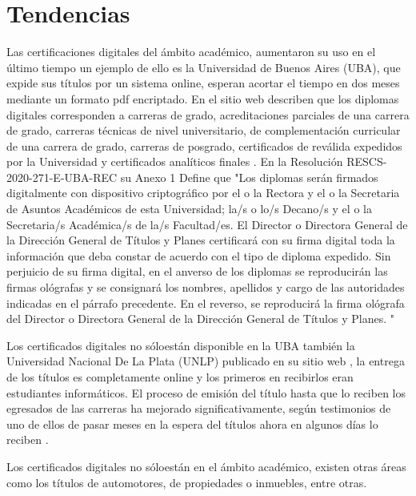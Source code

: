 \section{Tendencias}
Las certificaciones digitales del ámbito académico, aumentaron su uso en el último tiempo un ejemplo de ello es  
la Universidad de Buenos Aires (UBA), que expide sus títulos por un sistema online, esperan acortar el tiempo 
en dos meses mediante un formato pdf encriptado. En el sitio web describen que los diplomas digitales 
corresponden a carreras  de grado, acreditaciones parciales de una carrera de grado, carreras técnicas de nivel universitario, de 
complementación curricular de una carrera de grado, carreras de posgrado, certificados de reválida expedidos 
por la Universidad y certificados analíticos finales \cite[]{facultad_de_farmacia_y_bioquimica_universidad_de_buenos_aires_diploma_2020}.
En la Resolución {RESCS}-2020-271-{E}-{UBA}-{REC}\cite[]{universidad_de_buenos_aires_resolucion_2020} su Anexo 1 \cite[]{universidad_de_buenos_aires_anexo1_2020} 
Define que "Los diplomas serán firmados digitalmente con dispositivo
criptográfico por el o la Rectora y el o la Secretaria de Asuntos Académicos de esta
Universidad; la/s o lo/s Decano/s y el o la Secretaria/s Académica/s de la/s
Facultad/es. El Director o Directora General de la Dirección General de Títulos y
Planes certificará con su firma digital toda la información que deba constar de
acuerdo con el tipo de diploma expedido.
Sin perjuicio de su firma digital, en el anverso de los diplomas se reproducirán las
firmas ológrafas y se consignará los nombres, apellidos y cargo de las autoridades
indicadas en el párrafo precedente. En el reverso, se reproducirá la firma ológrafa
del Director o Directora General de la Dirección General de Títulos y Planes. 
"

Los certificados digitales no sóloestán disponible en la UBA también  la Universidad Nacional De La Plata (UNLP) 
publicado en su sitio web , la entrega de los títulos es completamente online y los primeros en recibirlos
eran estudiantes informáticos. El proceso de emisión del  título  hasta que lo reciben los egresados de las 
carreras ha mejorado significativamente, según testimonios de uno de ellos de pasar 
meses en la espera del títulos ahora en algunos días lo reciben \cite[]{unlp_certificado_2020}.

Los certificados digitales no sóloestán en el ámbito académico, existen otras áreas 
como los títulos de automotores, de propiedades o inmuebles, entre otras. 
   
